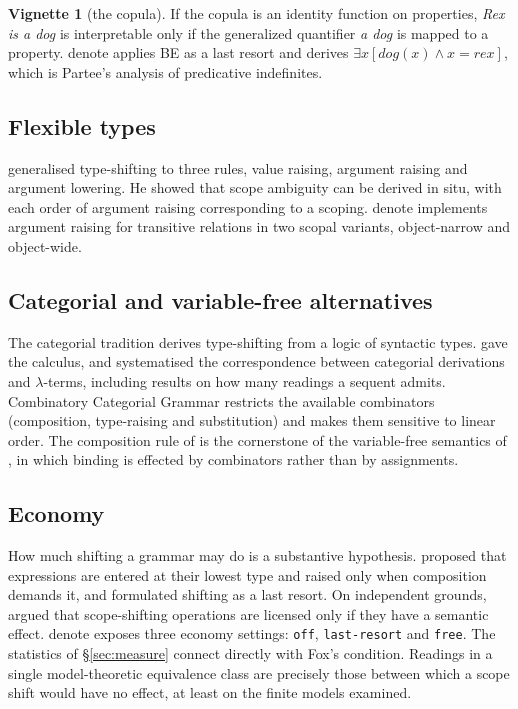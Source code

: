 \documentclass[11pt,a4paper]{article}
\newcommand{\dn}{\textsf{denote}}
\theoremstyle{definition}
\newtheorem{vignette}{Vignette}
\begin{document}
\begin{vignette}[the copula]\label{v:copula}
If the copula is an identity function on properties, \textit{Rex is a dog} is interpretable only if the generalized quantifier \textit{a dog} is mapped to a property. \dn{} applies \textsf{BE} as a last resort and derives $\exists x[\textit{dog}(x)\wedge x=\textit{rex}]$, which is Partee's analysis of predicative indefinites.
\end{vignette}

\subsection{Flexible types}
\citet{hendriks1993} generalised type-shifting to three rules, value raising, argument raising and argument lowering. He showed that scope ambiguity can be derived in situ, with each order of argument raising corresponding to a scoping. \dn{} implements argument raising for transitive relations in two scopal variants, object-narrow and object-wide.

\subsection{Categorial and variable-free alternatives}
The categorial tradition derives type-shifting from a logic of syntactic types. \citet{lambek1958} gave the calculus, and \citet{vanbenthem1991} systematised the correspondence between categorial derivations and $\lambda$-terms, including results on how many readings a sequent admits. Combinatory Categorial Grammar \citep{steedman2000} restricts the available combinators (composition, type-raising and substitution) and makes them sensitive to linear order. The composition rule of \citet{geach1972} is the cornerstone of the variable-free semantics of \citet{jacobson1999}, in which binding is effected by combinators rather than by assignments.

\subsection{Economy}
How much shifting a grammar may do is a substantive hypothesis. \citet{parteerooth1983} proposed that expressions are entered at their lowest type and raised only when composition demands it, and \citet{partee1987} formulated shifting as a last resort. On independent grounds, \citet{fox2000} argued that scope-shifting operations are licensed only if they have a semantic effect. \dn{} exposes three economy settings: \texttt{off}, \texttt{last-resort} and \texttt{free}. The statistics of \S\ref{sec:measure} connect directly with Fox's condition. Readings in a single model-theoretic equivalence class are precisely those between which a scope shift would have no effect, at least on the finite models examined.
\end{document}
